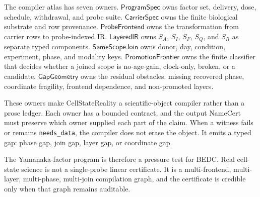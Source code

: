 The compiler atlas has seven owners. $\mathsf{ProgramSpec}$ owns factor set, delivery, dose, schedule, withdrawal, and probe suite. $\mathsf{CarrierSpec}$ owns the finite biological substrate and row provenance. $\mathsf{ProbeFrontend}$ owns the transformation from carrier rows to probe-indexed IR. $\mathsf{LayeredIR}$ owns $S_A$, $S_I$, $S_F$, $S_Q$, and $S_R$ as separate typed components. $\mathsf{SameScopeJoin}$ owns donor, day, condition, experiment, phase, and modality keys. $\mathsf{PromotionFrontier}$ owns the finite classifier that decides whether a joined scope is no-age-gain, clock-only, broken, or a candidate. $\mathsf{GapGeometry}$ owns the residual obstacles: missing recovered phase, coordinate fragility, frontend dependence, and non-promoted layers.

These owners make CellStateReality a scientific-object compiler rather than a prose ledger. Each owner has a bounded contract, and the output NameCert must preserve which owner supplied each part of the claim. When a witness fails or remains \texttt{needs\_data}, the compiler does not erase the object. It emits a typed gap: phase gap, join gap, layer gap, or coordinate gap.

The Yamanaka-factor program is therefore a pressure test for BEDC. Real cell-state science is not a single-probe linear certificate. It is a multi-frontend, multi-layer, multi-phase, multi-join compilation graph, and the certificate is credible only when that graph remains auditable.
